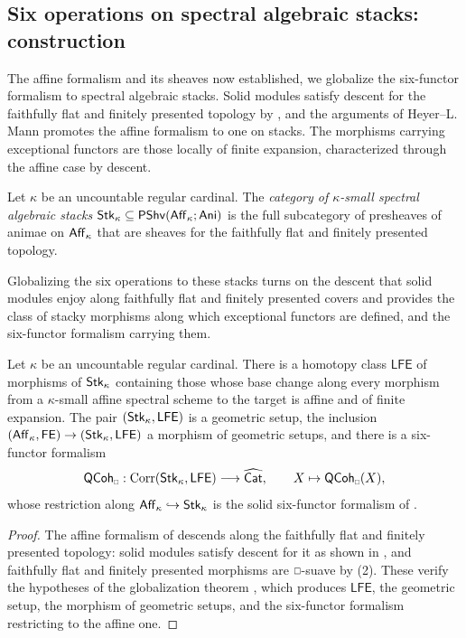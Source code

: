 \subsection{Six operations on spectral algebraic stacks: construction}\label{subsec: construction on stacks}
The affine formalism and its sheaves now established, we globalize the six-functor formalism to spectral algebraic stacks. Solid modules satisfy descent for the faithfully flat and finitely presented topology by , and the arguments of Heyer--L. Mann \cite[\S 3.4]{HeyerMann6FF} promotes the affine formalism to one on stacks. The morphisms carrying exceptional functors are those locally of finite expansion, characterized through the affine case by descent.
\begin{definition}\label{def: kappa-small spectral stacks}
    Let $\kappa$ be an uncountable regular cardinal. The \emph{category of $\kappa$-small spectral algebraic stacks} $\mathsf{Stk}_{\kappa}\subseteq\mathsf{PShv}(\mathsf{Aff}_{\kappa};\mathsf{Ani})$ is the full subcategory of presheaves of animae on $\mathsf{Aff}_{\kappa}$ that are sheaves for the faithfully flat and finitely presented topology.
\end{definition}
Globalizing the six operations to these stacks turns on the descent that solid modules enjoy along faithfully flat and finitely presented covers and provides the class of stacky morphisms along which exceptional functors are defined, and the six-functor formalism carrying them.
\begin{theorem}\label{thm: six-functor formalism on stacks}
    Let $\kappa$ be an uncountable regular cardinal. There is a homotopy class $\mathsf{LFE}$ of morphisms of $\mathsf{Stk}_{\kappa}$ containing those whose base change along every morphism from a $\kappa$-small affine spectral scheme to the target is affine and of finite expansion. The pair $(\mathsf{Stk}_{\kappa},\mathsf{LFE})$ is a geometric setup, the inclusion $(\mathsf{Aff}_{\kappa},\mathsf{FE})\to(\mathsf{Stk}_{\kappa},\mathsf{LFE})$ a morphism of geometric setups, and there is a six-functor formalism
    $$\QCoh_{\sld}:\Corr(\Stk_{\kappa},\mathsf{LFE})\longrightarrow\widehat{\Cat},\qquad X\mapsto\QCoh_{\sld}(X),$$
    whose restriction along $\mathsf{Aff}_{\kappa}\hookrightarrow\mathsf{Stk}_{\kappa}$ is the solid six-functor formalism of .
\end{theorem}
\begin{proof}
    The affine formalism of  descends along the faithfully flat and finitely presented topology: solid modules satisfy descent for it as shown in , and faithfully flat and finitely presented morphisms are $\msld$-suave by  (2). These verify the hypotheses of the globalization theorem \cite[Thm. 3.4.11]{HeyerMann6FF}, which produces $\mathsf{LFE}$, the geometric setup, the morphism of geometric setups, and the six-functor formalism restricting to the affine one.
\end{proof}

